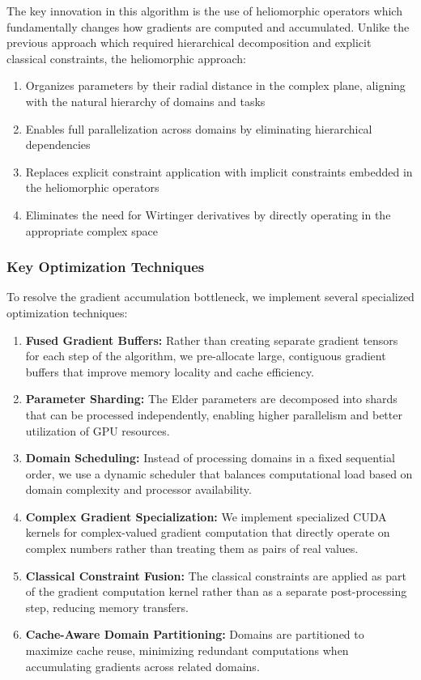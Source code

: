 The key innovation in this algorithm is the use of heliomorphic operators which fundamentally changes how gradients are computed and accumulated. Unlike the previous approach which required hierarchical decomposition and explicit classical constraints, the heliomorphic approach:

\begin{enumerate}
    \item Organizes parameters by their radial distance in the complex plane, aligning with the natural hierarchy of domains and tasks
    \item Enables full parallelization across domains by eliminating hierarchical dependencies
    \item Replaces explicit constraint application with implicit constraints embedded in the heliomorphic operators
    \item Eliminates the need for Wirtinger derivatives by directly operating in the appropriate complex space
\end{enumerate}

\subsubsection{Key Optimization Techniques}

To resolve the gradient accumulation bottleneck, we implement several specialized optimization techniques:

\begin{enumerate}
    \item \textbf{Fused Gradient Buffers:} Rather than creating separate gradient tensors for each step of the algorithm, we pre-allocate large, contiguous gradient buffers that improve memory locality and cache efficiency.
    
    \item \textbf{Parameter Sharding:} The Elder parameters are decomposed into shards that can be processed independently, enabling higher parallelism and better utilization of GPU resources.
    
    \item \textbf{Domain Scheduling:} Instead of processing domains in a fixed sequential order, we use a dynamic scheduler that balances computational load based on domain complexity and processor availability.
    
    \item \textbf{Complex Gradient Specialization:} We implement specialized CUDA kernels for complex-valued gradient computation that directly operate on complex numbers rather than treating them as pairs of real values.
    
    \item \textbf{Classical Constraint Fusion:} The classical constraints are applied as part of the gradient computation kernel rather than as a separate post-processing step, reducing memory transfers.
    
    \item \textbf{Cache-Aware Domain Partitioning:} Domains are partitioned to maximize cache reuse, minimizing redundant computations when accumulating gradients across related domains.
\end{enumerate}

